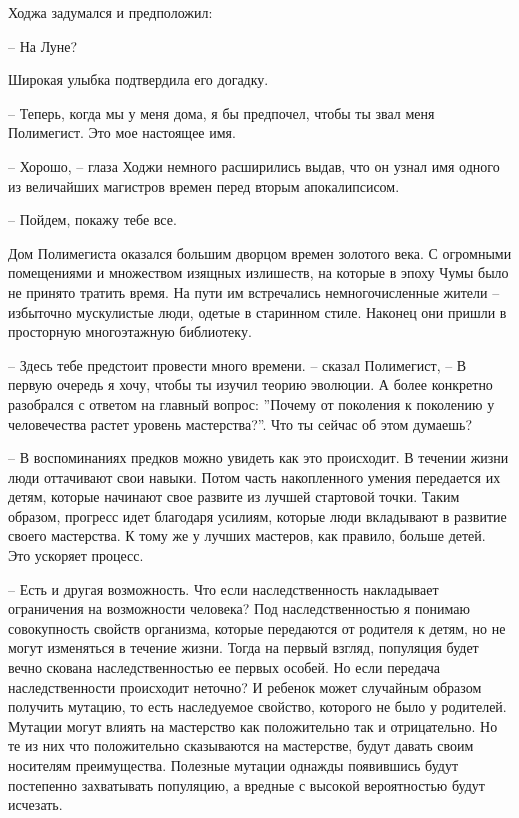 \documentclass[12pt,a4paper]{article}
\begin{document}
Ходжа задумался и предположил:

-- На Луне?

Широкая улыбка подтвердила его догадку.

-- Теперь, когда мы у меня дома, я бы предпочел, чтобы ты звал меня Полимегист. Это мое настоящее имя.

-- Хорошо, -- глаза Ходжи немного расширились выдав, что он узнал имя одного из величайших магистров времен перед вторым апокалипсисом.

-- Пойдем, покажу тебе все.

Дом Полимегиста оказался большим дворцом времен золотого века. С огромными помещениями и множеством изящных излишеств, на которые в эпоху Чумы было не принято тратить время. На пути им встречались немногочисленные жители -- избыточно мускулистые люди, одетые в старинном стиле. Наконец они пришли в просторную многоэтажную библиотеку.

-- Здесь тебе предстоит провести много времени. -- сказал Полимегист, -- В первую очередь я хочу, чтобы ты изучил теорию эволюции. А более конкретно разобрался с ответом на главный вопрос: ''Почему от поколения к поколению у человечества растет уровень мастерства?''. Что ты сейчас об этом думаешь?

-- В воспоминаниях предков можно увидеть как это происходит. В течении жизни люди оттачивают свои навыки. Потом часть накопленного умения передается их детям, которые начинают свое развите из лучшей стартовой точки. Таким образом, прогресс идет благодаря усилиям, которые люди вкладывают в развитие своего мастерства. К тому же у лучших мастеров, как правило, больше детей. Это ускоряет процесс.

-- Есть и другая возможность. Что если наследственность накладывает ограничения на возможности человека? Под наследственностью я понимаю совокупность свойств организма, которые передаются от родителя к детям, но не могут изменяться в течение жизни. Тогда на первый взгляд, популяция будет вечно скована наследственностью ее первых особей. Но если передача наследственности происходит неточно? И ребенок может случайным образом получить мутацию, то есть наследуемое свойство, которого не было у родителей. Мутации могут влиять на мастерство как положительно так и отрицательно. Но те из них что положительно сказываются на мастерстве, будут давать своим носителям преимущества. Полезные мутации однажды появившись будут постепенно захватывать популяцию, а вредные с высокой вероятностью будут исчезать.
\end{document}
